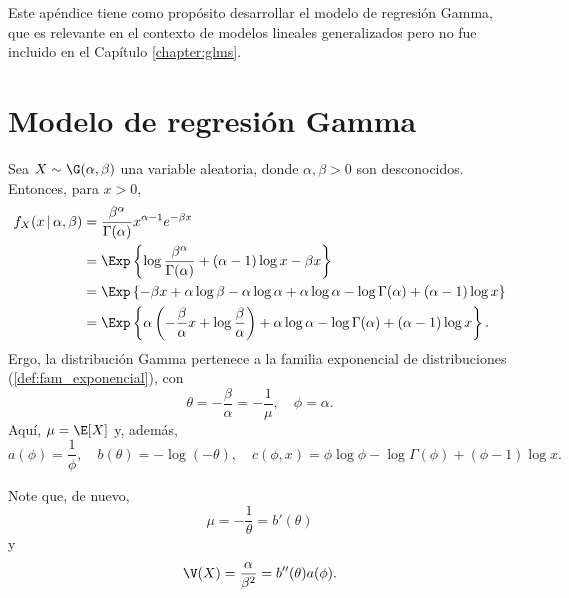 Este apéndice tiene como propósito desarrollar el modelo de regresión Gamma, que es relevante en el contexto de modelos lineales generalizados pero no fue incluido en el Capítulo \ref{chapter:glms}.





\section{Modelo de regresión Gamma}


Sea $X \sim \G (\alpha, \beta)$ una variable aleatoria, donde $\alpha, \beta > 0$ son desconocidos. Entonces, para $x>0$,
\begin{align*}
	f_X(x \, | \, \alpha, \beta ) &= \frac{ \beta^{\alpha} }{ \Gamma(\alpha) } x^{\alpha - 1} e^{-\beta x} \\
    &= \Exp \left\{ \log \frac{ \beta^{\alpha} }{ \Gamma(\alpha) } + (\alpha - 1) \log x - \beta x \right\} \\
    &= \Exp \left\{ -\beta x + \alpha \log \beta - \alpha \log \alpha + \alpha \log \alpha - \log \Gamma(\alpha) + (\alpha - 1) \log x \right\} \\
    &= \Exp \left\{ \alpha \left( -\frac{\beta}{\alpha} x + \log \frac{\beta}{\alpha} \right) + \alpha \log \alpha - \log \Gamma(\alpha) + (\alpha - 1) \log x \right\}.
\end{align*}
Ergo, la distribución Gamma pertenece a la familia exponencial de distribuciones (\ref{def:fam_exponencial}), con
\begin{equation*}
	\theta = -\frac{\beta}{\alpha} = -\frac{1}{\mu}, \quad \phi = \alpha.
\end{equation*}
Aquí, $\mu = \E [X]$ y, además,
\begin{equation*}
	a(\phi) = \frac{1}{\phi}, \quad b(\theta) = -\log(-\theta), \quad c(\phi, x) = \phi \log \phi - \log \Gamma(\phi) + (\phi - 1) \log x.
\end{equation*}

Note que, de nuevo,
\begin{equation*}
	\mu = -\frac{1}{\theta} = b'(\theta)
\end{equation*}
y
\begin{equation*}
	\V (X) = \frac{\alpha}{\beta^2} = b''(\theta) a(\phi).
\end{equation*}

